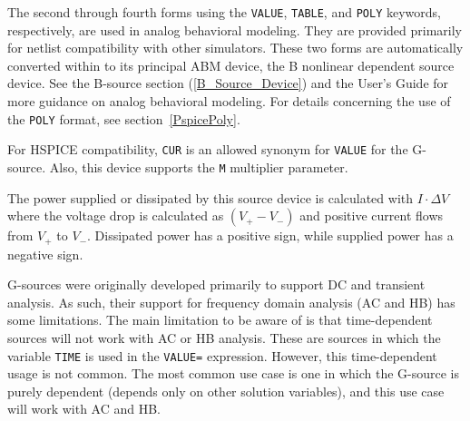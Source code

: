 \begin{Device}
The second through fourth forms using the \texttt{VALUE}, \texttt{TABLE}, and
\texttt{POLY} keywords, respectively, are used in analog behavioral modeling.
They are provided primarily for netlist compatibility with other simulators.
These two forms are automatically converted within \Xyce{} to its principal ABM
device, the B nonlinear dependent source device. See the B-source section
(\ref{B_Source_Device}) and the \Xyce{} User's Guide for more guidance on
analog behavioral modeling.  For details concerning the use of the
\texttt{POLY} format, see section~\ref{PspicePoly}.

For HSPICE compatibility, \texttt{CUR} is an allowed synonym for
\texttt{VALUE} for the G-source.  
  Also, this device supports the \texttt{M} multiplier parameter.

The power supplied or dissipated by this source device is calculated 
with $I \cdot \Delta V$ where the voltage drop is calculated as $(V_+ - V_-)$ 
and positive current flows from $V_+$ to $V_-$.  Dissipated power has a
positive sign, while supplied power has a negative sign.

G-sources were originally developed primarily to support DC and transient analysis.  
As such, their support for frequency domain analysis (AC and HB) has some limitations.  
The main limitation to be aware of is that time-dependent sources will not work with AC or HB analysis.  
These are sources in which the variable \texttt{TIME} is used in the \texttt{VALUE=} expression. 
However, this time-dependent usage is not common.  The most 
common use case is one in which the G-source is purely dependent (depends only 
on other solution variables), and this use case will work with AC and HB.  
\end{Device}

